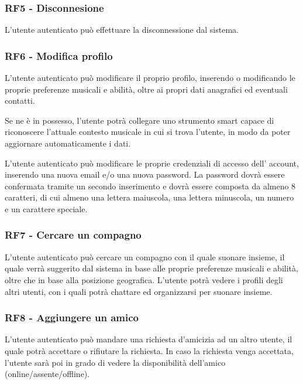 \documentclass[12pt, a4paper]{article}
\begin{document}
\subsubsection*{\hypertarget{RF5}{RF5 - Disconnesione}}

L'utente autenticato può effettuare la disconnessione dal sistema.

\subsubsection*{\hypertarget{RF6}{RF6 - Modifica profilo}}
L'utente autenticato può modificare il proprio profilo, inserendo o modificando le proprie preferenze musicali e abilità, oltre ai propri dati anagrafici ed eventuali contatti.


Se ne è in possesso, l'utente potrà collegare uno strumento smart capace di riconoscere l'attuale contesto musicale in cui si trova l'utente, in modo da poter aggiornare automaticamente i dati.


L'utente autenticato può modificare le proprie credenziali di accesso dell' account, inserendo una nuova email e/o una nuova password. La password dovrà essere confermata tramite un secondo inserimento e dovrà essere composta da almeno 8 caratteri, di cui almeno una lettera maiuscola, una lettera minuscola, un numero e un carattere speciale.


\subsubsection*{\hypertarget{RF7}{RF7 - Cercare un compagno}}

L'utente autenticato può cercare un compagno con il quale suonare insieme, il quale verrà suggerito dal sistema in base alle proprie preferenze musicali e abilità, oltre che in base alla posizione geografica. L'utente potrà vedere i profili degli altri utenti, con i quali potrà chattare ed organizzarsi per suonare insieme.

\subsubsection*{\hypertarget{RF8}{RF8 - Aggiungere un amico}}

L'utente autenticato può mandare una richiesta d'amicizia ad un altro utente, il quale potrà accettare o rifiutare la richiesta. In caso la richiesta venga accettata, l'utente sarà poi in grado di vedere la disponibilità dell'amico (online/assente/offline).
\end{document}
